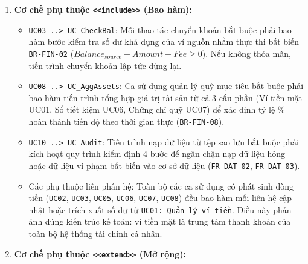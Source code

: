\documentclass[11pt,a4paper]{article}
\providecommand{\tightlist}{
  \setlength{\itemsep}{0pt}\setlength{\parskip}{0pt}}
\begin{document}
\begin{enumerate}
\def\labelenumi{\arabic{enumi}.}
\setcounter{enumi}{1}
\item
  \textbf{Cơ chế phụ thuộc
  \texttt{\textless{}\textless{}include\textgreater{}\textgreater{}}
  (Bao hàm):}

  \begin{itemize}
  \tightlist
  \item
    \texttt{UC03\ ..\textgreater{}\ UC\_CheckBal}: Mỗi thao tác chuyển
    khoản bắt buộc phải bao hàm bước kiểm tra số dư khả dụng của ví
    nguồn nhằm thực thi bất biến \texttt{BR-FIN-02}
    (\(Balance_{source} - Amount - Fee \ge 0\)). Nếu không thỏa mãn,
    tiến trình chuyển khoản lập tức dừng lại.
  \item
    \texttt{UC08\ ..\textgreater{}\ UC\_AggAssets}: Ca sử dụng quản lý
    quỹ mục tiêu bắt buộc phải bao hàm tiến trình tổng hợp giá trị tài
    sản từ cả 3 cấu phần (Ví tiền mặt UC01, Sổ tiết kiệm UC06, Chứng chỉ
    quỹ UC07) để xác định tỷ lệ \% hoàn thành tiến độ theo thời gian
    thực (\texttt{BR-FIN-08}).
  \item
    \texttt{UC10\ ..\textgreater{}\ UC\_Audit}: Tiến trình nạp dữ liệu
    từ tệp sao lưu bắt buộc phải kích hoạt quy trình kiểm định 4 bước để
    ngăn chặn nạp dữ liệu hỏng hoặc dữ liệu vi phạm bất biến vào cơ sở
    dữ liệu (\texttt{FR-DAT-02}, \texttt{FR-DAT-03}).
  \item
    Các phụ thuộc liên phân hệ: Toàn bộ các ca sử dụng có phát sinh dòng
    tiền (\texttt{UC02}, \texttt{UC03}, \texttt{UC05}, \texttt{UC06},
    \texttt{UC07}, \texttt{UC08}) đều bao hàm mối liên hệ cập nhật hoặc
    trích xuất số dư từ \texttt{UC01:\ Quản\ lý\ ví\ tiền}. Điều này
    phản ánh đúng kiến trúc kế toán: ví tiền mặt là trung tâm thanh
    khoản của toàn bộ hệ thống tài chính cá nhân.
  \end{itemize}
\item
  \textbf{Cơ chế phụ thuộc
  \texttt{\textless{}\textless{}extend\textgreater{}\textgreater{}} (Mở
  rộng):}


\end{enumerate}
\end{document}
